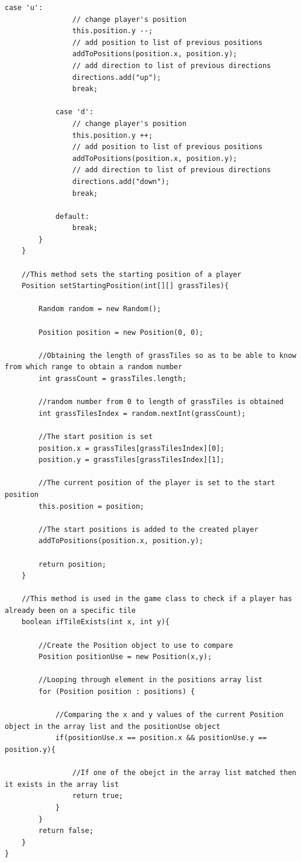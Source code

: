 \documentclass[a4paper,12pt]{extarticle}
\begin{document}
\begin{lstlisting}[caption=The initial code of the Player class]
            case 'u':
                // change player's position
                this.position.y --;
                // add position to list of previous positions
                addToPositions(position.x, position.y);
                // add direction to list of previous directions
                directions.add("up");
                break;

            case 'd':
                // change player's position
                this.position.y ++;
                // add position to list of previous positions
                addToPositions(position.x, position.y);
                // add direction to list of previous directions
                directions.add("down");
                break;

            default:
                break;
        }
    }

    //This method sets the starting position of a player
    Position setStartingPosition(int[][] grassTiles){

        Random random = new Random();

        Position position = new Position(0, 0);

        //Obtaining the length of grassTiles so as to be able to know from which range to obtain a random number
        int grassCount = grassTiles.length;

        //random number from 0 to length of grassTiles is obtained
        int grassTilesIndex = random.nextInt(grassCount);

        //The start position is set
        position.x = grassTiles[grassTilesIndex][0];
        position.y = grassTiles[grassTilesIndex][1];

        //The current position of the player is set to the start position
        this.position = position;

        //The start positions is added to the created player
        addToPositions(position.x, position.y);

        return position;
    }

    //This method is used in the game class to check if a player has already been on a specific tile
    boolean ifTileExists(int x, int y){

        //Create the Position object to use to compare
        Position positionUse = new Position(x,y);

        //Looping through element in the positions array list
        for (Position position : positions) {

            //Comparing the x and y values of the current Position object in the array list and the positionUse object
            if(positionUse.x == position.x && positionUse.y == position.y){

                //If one of the obejct in the array list matched then it exists in the array list
                return true;
            }
        }
        return false;
    }
}
\end{lstlisting}
\end{document}
